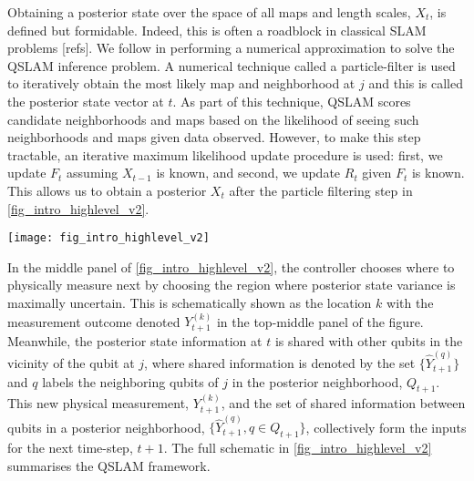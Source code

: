 Obtaining a posterior state over the space of all maps and length scales, $X_t$, is defined but formidable. Indeed, this is often a roadblock in classical SLAM problems [refs]. We follow \cite{thrun2001probabilistic} in performing a numerical approximation to solve the QSLAM inference problem. A numerical technique called a particle-filter is used to iteratively obtain the most likely map and neighborhood at $j$ and this is called the posterior state vector at $t$. As part of this technique, QSLAM scores candidate neighborhoods and maps based on the likelihood of seeing such neighborhoods and maps  given data observed. However, to make this step tractable, an iterative maximum likelihood update procedure is used: first, we update $F_t$ assuming $X_{t-1}$ is known, and second, we update $R_t$ given $F_t$ is known. This allows us to obtain a posterior $X_t$ after the particle filtering  step in \cref{fig_intro_highlevel_v2}.
\begin{figure*}
	\texttt{[image: fig\_intro\_highlevel\_v2]}
	\caption{\label{fig_intro_highlevel_v2} Schematic overview of QSLAM for an incoming qubit measurement, $Y^{(j)}_t$ at qubit $j$. A particle filter estimates the map, $F_t$, and discovers neighborhoods [circular shaded] parameterised by $R_t^{(j)}$ for sharing state information. Posterior state estimates from the particle filter are used (a) by the controller, to choose $k$ as the location of the next measurement, $Y^{(k)}_{t+1}$ based on regions of highest estimated uncertainty [middle top]; (b) to share information at $j$ within the posterior neighborhood, $Q$ via $\hat{Y}^{(q)}_{t+1}$, for  all $q \in Q$ [middle bottom] before commencing the next iteration.}  	
\end{figure*} 

In the middle panel of \cref{fig_intro_highlevel_v2}, the controller chooses where to physically measure next by choosing the region where posterior state variance is maximally uncertain. This is schematically shown as the location $k$ with the measurement outcome denoted $Y_{t+1}^{(k)}$ in the top-middle panel of the figure. Meanwhile, the posterior state information at $t$ is shared with other qubits in the vicinity of the qubit at $j$, where shared information is denoted by the set $\{\hat{Y}_{t+1}^{(q)} \}$ and $q$ labels the neighboring qubits of $j$ in the posterior neighborhood, $Q_{t+1}$. This new physical measurement, $Y_{t+1}^{(k)}$,  and the set of shared information between qubits in a posterior neighborhood, $\{\hat{Y}_{t+1}^{(q)}, q \in Q_{t+1}\}$,  collectively form the inputs for the next time-step, $t+1$. The full schematic in \cref{fig_intro_highlevel_v2} summarises the QSLAM framework.


